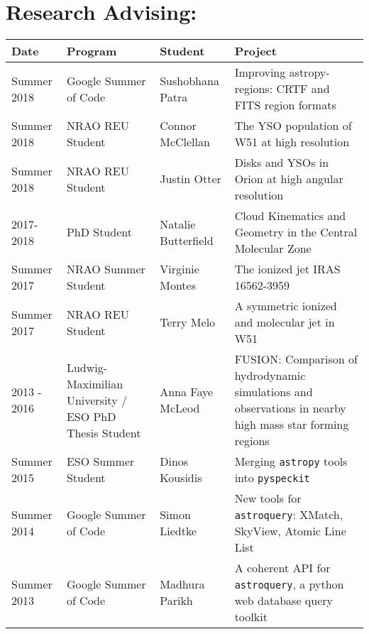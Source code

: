 \setlength{\extrarowheight}{4pt}
\section*{Research Advising: }
\vspace{-12pt}
\begin{tabular}{p{0.75in}p{1.3in}lp{2.6in}}
    Date  & Program & Student &  Project \\
    \hline
    Summer 2018 & Google Summer of Code &                                         Sushobhana Patra    &  Improving astropy-regions: CRTF and FITS region formats \\
    Summer 2018 & NRAO REU Student &                                              Connor McClellan    &  The YSO population of W51 at high resolution \\
    Summer 2018 & NRAO REU Student &                                              Justin Otter    &  Disks and YSOs in Orion at high angular resolution \\
    2017-2018 & PhD Student &                                                        Natalie Butterfield &  Cloud Kinematics and Geometry in the Central Molecular Zone \\
    Summer 2017 & NRAO Summer Student &                                              Virginie Montes    &  The ionized jet IRAS 16562-3959 \\
    Summer 2017 & NRAO REU Student &                                                 Terry Melo    &  A symmetric ionized and molecular jet in W51 \\
    2013 - 2016 & Ludwig-Maximilian University / ESO PhD Thesis Student & Anna Faye McLeod &  FUSION: Comparison of hydrodynamic simulations and observations in nearby high mass star forming regions  \\
    Summer 2015 & ESO Summer Student &                                                 Dinos Kousidis    &  Merging \texttt{astropy} tools into \texttt{pyspeckit} \\
    Summer 2014 & Google Summer of Code &                                                 Simon Liedtke    &  New tools for \texttt{astroquery}: XMatch, SkyView, Atomic Line List \\
    Summer 2013 & Google Summer of Code &                                                 Madhura Parikh   &  A coherent API for \texttt{astroquery}, a python web database query toolkit \\
\end{tabular}

